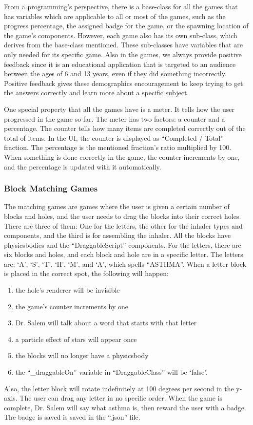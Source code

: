 From a programming’s perspective, there is a base-class for all the games that has variables which are applicable to all or most of the games, such as the progress percentage, the assigned badge for the game, or the spawning location of the game’s components. However, each game also has its own sub-class, which derives from the base-class mentioned. These sub-classes have variables that are only needed for its specific game. Also in the games, we always provide positive feedback since it is an educational application that is targeted to an audience between the ages of 6 and 13 years, even if they did something incorrectly. Positive feedback gives these demographics encouragement to keep trying to get the answers correctly and learn more about a specific subject.
 
One special property that all the games have is a meter. It tells how the user progressed in the game so far. The meter has two factors: a counter and a percentage. The counter tells how many items are completed correctly out of the total of items. In the UI, the counter is displayed as “Completed / Total” fraction. The percentage is the mentioned fraction's ratio multiplied by 100. When something is done correctly in the game, the counter increments by one, and the percentage is updated with it automatically.

\subsubsection*{Block Matching Games}
The matching games are games where the user is given a certain number of blocks and holes, and the user needs to drag the blocks into their correct holes. There are three of them: One for the letters, the other for the inhaler types and components, and the third is for assembling the inhaler. All the blocks have physicsbodies and the “DraggableScript” components. For the letters, there are six blocks and holes, and each block and hole are in a specific letter. The letters are: ‘A’, ‘S’, ‘T’, ‘H’, ‘M’, and ‘A’, which spells “ASTHMA”. When a letter block is placed in the correct spot, the following will happen: 
\begin{enumerate}
\item{the hole's renderer will be invisible}
\item{the game’s counter increments by one}
\item{Dr. Salem will talk about a word that starts with that letter}
\item{a particle effect of stars will appear once}
\item{the blocks will no longer have a physicsbody}
\item{the “\_draggableOn\normalfont” variable in “DraggableClass\normalfont” will be ‘false\normalfont’.}
\end{enumerate}
Also, the letter block will rotate indefinitely at 100 degrees per second in the y-axis. The user can drag any letter in no specific order. When the game is complete, Dr. Salem will say what asthma is, then reward the user with a badge. The badge is saved is saved in the “.json” file.

